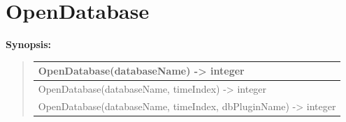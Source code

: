 \documentclass[letterpaper,10pt,english]{sphinxmanual}
\begin{document}
\section{OpenDatabase}
\label{functions:opendatabase}
\begin{DUlineblock}{0em}
\item[] \textbf{Synopsis:}
\end{DUlineblock}
\begin{quote}

\begin{tabulary}{\linewidth}{|L|}
\hline

OpenDatabase(databaseName) -\textgreater{} integer
\\
\hline
OpenDatabase(databaseName, timeIndex) -\textgreater{} integer
\\
\hline
OpenDatabase(databaseName, timeIndex, dbPluginName) -\textgreater{} integer
\\
\hline\end{tabulary}

\end{quote}
\end{document}

